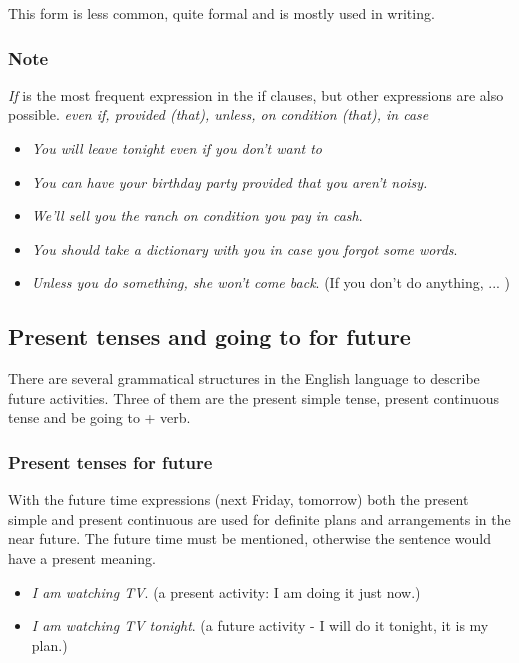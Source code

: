 This form is less common, quite formal and is mostly used in writing.

\subsubsection{Note}

\textit{If} is the most frequent expression in the if clauses, but other expressions are also possible. \textit{even if, provided (that), unless, on condition (that), in case}

\begin{itemize}

\item \textit{You will leave tonight even if you don't want to}
\item \textit{You can have your birthday party provided that you aren't noisy.}
\item \textit{We'll sell you the ranch on condition you pay in cash}.
\item \textit{You should take a dictionary with you in case you forgot some words}.
\item \textit{Unless you do something, she won't come back}. (If you don't do anything, ... )

\end{itemize}

\subsection{Present tenses and going to for future}

There are several grammatical structures in the English language to describe future activities. Three of them are the present simple tense, present continuous tense and be going to + verb.

\subsubsection{Present tenses for future}

With the future time expressions (next Friday, tomorrow) both the present simple and present continuous are used for definite plans and arrangements in the near future. The future time must be mentioned, otherwise the sentence would have a present meaning. 

\begin{itemize}

\item \textit{I am watching TV}. (a present activity: I am doing it just now.) 
\item \textit{I am watching TV tonight}. (a future activity - I will do it tonight, it is my plan.)
\end{itemize}

